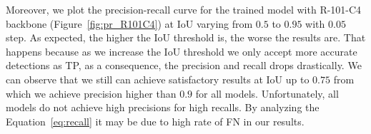 %
%




Moreover, we plot the precision-recall curve for the trained model with R-101-C4 backbone %
(Figure~\ref{fig:pr_R101C4}) at IoU varying from $0.5$ to $0.95$ with $0.05$ step.
As expected, the higher the IoU threshold is, the worse the results are.
That happens because as we increase the IoU threshold we only accept more accurate detections as TP,
as a consequence, the precision and recall drops drastically.
We can observe that we still can achieve satisfactory results at IoU up to $0.75$ from which we achieve precision higher than $0.9$ for all models.
Unfortunately, all models do not achieve high precisions for high recalls.
By analyzing the Equation~\eqref{eq:recall} it may be due to high rate of FN in our results.


